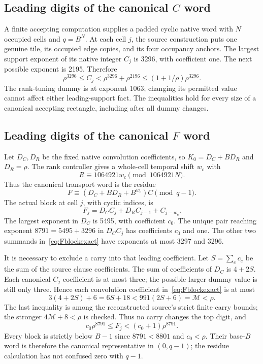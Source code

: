 \documentclass[11pt]{article}
\theoremstyle{definition}\newtheorem{definition}[theorem]{Definition}
\theoremstyle{remark}\newtheorem{remark}[theorem]{Remark}
\begin{document}
\subsection{Leading digits of the canonical \texorpdfstring{$C$}{C} word}

A finite accepting computation supplies a padded cyclic native word with
$N$ occupied cells and $q=B^N$. At each cell $j$, the source construction
puts one genuine tile, its occupied edge copies, and its four occupancy
anchors. The largest support exponent of its native integer $C_j$ is 3296,
with coefficient one. The next possible exponent is 2195. Therefore
\begin{equation}\label{eq:Cblock}
 \rho^{3296}\le C_j<\rho^{3296}+\rho^{2196}
                         \le(1+1/\rho)\rho^{3296}.
\end{equation}
The rank-tuning dummy is at exponent 1063; changing its permitted value
cannot affect either leading-support fact. The inequalities hold for every
size of a canonical accepting rectangle, including after all dummy changes.

\subsection{Leading digits of the canonical \texorpdfstring{$F$}{F} word}

Let $D_C,D_R$ be the fixed native convolution coefficients, so
$K_0=D_C+BD_R$ and $D_R=\rho$. The rank controller gives a whole-cell
temporal shift $w_c$ with
\[
 R\equiv1064921w_c\pmod{1064921N}.
\]
Thus the canonical transport word is the residue
\[
 F\equiv(D_C+BD_R+B^{w_c})C\pmod{q-1}.
\]
The actual block at cell $j$, with cyclic indices, is
\begin{equation}\label{eq:Fblockexact}
 F_j=D_CC_j+D_RC_{j-1}+C_{j-w_c}.
\end{equation}
The largest exponent in $D_C$ is 5495, with coefficient $c_0$.
The unique pair reaching exponent $8791=5495+3296$ in $D_CC_j$ has
coefficients $c_0$ and one. The other two summands in~\eqref{eq:Fblockexact}
have exponents at most 3297 and 3296.

It is necessary to exclude a carry into that leading coefficient. Let
$S=\sum_e c_e$ be the sum of the source clause coefficients. The sum of
coefficients of $D_C$ is $4+2S$. Each canonical $C_j$ coefficient is at
most three; the possible larger dummy value is still only three. Hence
each convolution coefficient in~\eqref{eq:Fblockexact} is at most
\[
 3(4+2S)+6=6S+18<991(2S+6)=\mathcal M<\rho.
\]
The last inequality is among the reconstructed source's strict finite
carry bounds; the stronger $4\mathcal M+8<\rho$ is checked. Thus no carry
changes the top digit, and
\begin{equation}\label{eq:Fblock}
 c_0\rho^{8791}\le F_j<(c_0+1)\rho^{8791}.
\end{equation}
Every block is strictly below $B-1$ since $8791<8801$ and $c_0<\rho$.
Their base-$B$ word is therefore the canonical representative in $(0,q-1)$;
the residue calculation has not confused zero with $q-1$.
\end{document}
